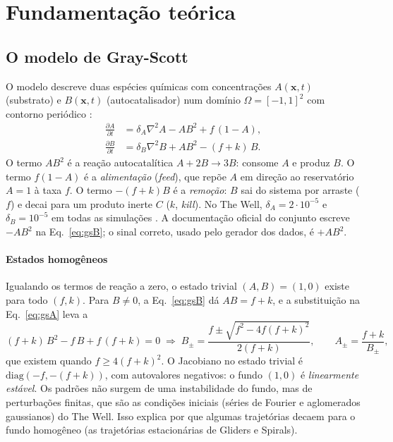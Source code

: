 \section{Fundamentação teórica}
\label{sec:teoria}

\subsection{O modelo de Gray-Scott}
\label{sec:grayscott}

O modelo descreve duas espécies químicas com concentrações $A(\mathbf{x},t)$ (substrato) e
$B(\mathbf{x},t)$ (autocatalisador) num domínio $\Omega=[-1,1]^2$ com contorno periódico
\cite{grayscott1984,pearson1993}:
\begin{align}
  \frac{\partial A}{\partial t} &= \delta_A \nabla^2 A - A B^2 + f\,(1 - A), \label{eq:gsA}\\
  \frac{\partial B}{\partial t} &= \delta_B \nabla^2 B + A B^2 - (f + k)\,B. \label{eq:gsB}
\end{align}
O termo $AB^2$ é a reação autocatalítica $A + 2B \to 3B$: consome $A$ e produz $B$. O termo
$f(1-A)$ é a \emph{alimentação} (\emph{feed}), que repõe $A$ em direção ao reservatório $A=1$ à
taxa $f$. O termo $-(f+k)B$ é a \emph{remoção}: $B$ sai do sistema por arraste ($f$) e decai para
um produto inerte $C$ ($k$, \emph{kill}). No The Well, $\delta_A = 2\cdot10^{-5}$ e
$\delta_B = 10^{-5}$ em todas as simulações \cite{ohana2024well}.
A documentação oficial do conjunto escreve $-AB^2$ na Eq.~\eqref{eq:gsB}; o sinal correto,
usado pelo gerador dos dados, é $+AB^2$.

\paragraph{Estados homogêneos} Igualando os termos de reação a zero, o estado trivial
$(A,B)=(1,0)$ existe para todo $(f,k)$. Para $B\neq0$, a Eq.~\eqref{eq:gsB} dá $AB = f+k$, e a
substituição na Eq.~\eqref{eq:gsA} leva a
\begin{equation}
  (f+k)\,B^2 - f\,B + f\,(f+k) = 0 \;\Rightarrow\;
  B_\pm = \frac{f \pm \sqrt{f^2 - 4 f (f+k)^2}}{2(f+k)}, \qquad A_\pm = \frac{f+k}{B_\pm},
\end{equation}
que existem quando $f \geq 4(f+k)^2$. O Jacobiano no estado trivial é
$\mathrm{diag}(-f, -(f+k))$, com autovalores negativos: o fundo $(1,0)$ é \emph{linearmente
estável}. Os padrões não surgem de uma instabilidade do fundo, mas de perturbações finitas, que
são as condições iniciais (séries de Fourier e aglomerados gaussianos) do The Well. Isso explica
por que algumas trajetórias decaem para o fundo homogêneo (as trajetórias estacionárias de Gliders
e Spirals).

